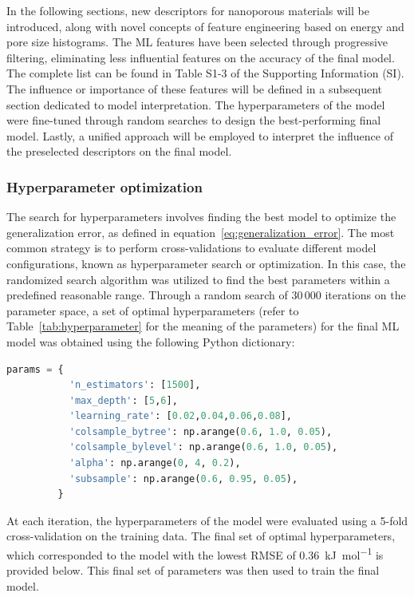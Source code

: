 \documentclass[main]{subfiles}
\begin{document}
In the following sections, new descriptors for nanoporous materials will be introduced, along with novel concepts of feature engineering based on energy and pore size histograms. The ML features have been selected through progressive filtering, eliminating less influential features on the accuracy of the final model. The complete list can be found in Table S1-3 of the Supporting Information (SI). The influence or importance of these features will be defined in a subsequent section dedicated to model interpretation. The hyperparameters of the model were fine-tuned through random searches to design the best-performing final model. Lastly, a unified approach will be employed to interpret the influence of the preselected descriptors on the final model.

\subsubsection{Hyperparameter optimization}\label{sct:hyperparameter}

The search for hyperparameters involves finding the best model to optimize the generalization error, as defined in equation~\ref{eq:generalization_error}. The most common strategy is to perform cross-validations to evaluate different model configurations, known as hyperparameter search or optimization. In this case, the randomized search algorithm was utilized to find the best parameters within a predefined reasonable range. Through a random search of 30\,000 iterations on the parameter space, a set of optimal hyperparameters (refer to Table~\ref{tab:hyperparameter} for the meaning of the parameters) for the final ML model was obtained using the following Python dictionary:

\begin{lstlisting}[language=Python]
params = {
           'n_estimators': [1500],
           'max_depth': [5,6],
           'learning_rate': [0.02,0.04,0.06,0.08],
           'colsample_bytree': np.arange(0.6, 1.0, 0.05),
           'colsample_bylevel': np.arange(0.6, 1.0, 0.05),
           'alpha': np.arange(0, 4, 0.2),
           'subsample': np.arange(0.6, 0.95, 0.05),
         }
\end{lstlisting}

At each iteration, the hyperparameters of the model were evaluated using a 5-fold cross-validation on the training data. The final set of optimal hyperparameters, which corresponded to the model with the lowest RMSE of \SI{0.36}{\kilo\joule\per\mole} is provided below. This final set of parameters was then used to train the final model.
\end{document}
